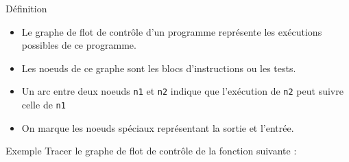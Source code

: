 \documentclass[10pt]{beamer}
\begin{document}
\begin{frame}{\Ctitle}{\stitle}
	\begin{block}{Définition}
		\begin{itemize}
		\item<1-> Le graphe de flot de contrôle d'un programme représente les exécutions possibles de ce programme.
		\item<2-> Les noeuds de ce graphe sont les blocs d'instructions ou les tests.
		\item<3-> Un arc entre deux noeuds {\tt n1} et {\tt n2} indique que l'exécution de {\tt n2} peut suivre celle de {\tt n1}
		\item<4-> On marque les noeuds spéciaux représentant la sortie et l'entrée.
		\end{itemize} 
	\end{block}
	\begin{exampleblock}{Exemple}
		Tracer le graphe de flot de contrôle de la fonction suivante :
	\end{exampleblock}
\end{frame}
\end{document}
